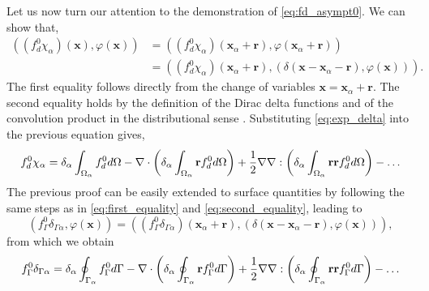 Let us now turn our attention to the demonstration of \ref{eq:fd_asympt0}. 
We can show that, 
\begin{align}
    ((f_d^0\chi_\alpha)(\textbf{x}),\varphi(\textbf{x}))
    &= ((f_d^0\chi_\alpha)(\textbf{x}_\alpha+\textbf{r}),\varphi(\textbf{x}_\alpha+\textbf{r})) \label{eq:first_equality}\\
    &= 
    ((f_d^0\chi_\alpha)(\textbf{x}_\alpha + \textbf{r}) ,(\delta(\textbf{x} - \textbf{x}_\alpha - \textbf{r}), \varphi(\textbf{x}))).
    \label{eq:second_equality}
\end{align}
The first equality follows directly from the change of variables $\textbf{x}=\textbf{x}_\alpha + \textbf{r}$. 
The second equality holds by the definition of the Dirac delta functions and of the convolution product in the distributional sense \citep{appel2007}.
Substituting \ref{eq:exp_delta}  into the previous equation gives, 
\begin{equation}
    f^0_d \chi_\alpha
    = 
    \delta_\alpha
    \int_{\Omega_{\alpha}} 
        f^0_d
     d\Omega
    - \mathbf{\nabla}\cdot\left(    
    \delta_\alpha
    \int_{\Omega_{\alpha}} 
    \textbf{r}
    f^0_d d\Omega
    \right)
    + \frac{1}{2}\mathbf{\nabla}\mathbf{\nabla} :\left(\delta_\alpha\int_{\Omega_{\alpha}} \textbf{rr} f^0_d d\Omega\right)
    - \ldots
\end{equation}
The previous proof can be easily extended to surface quantities by following the same steps as in \ref{eq:first_equality} and \ref{eq:second_equality},  leading to
\begin{equation} 
    (f_\Gamma^0 \delta_{\Gamma\alpha},\varphi(\textbf{x})) = ((f_\Gamma^0 \delta_{\Gamma\alpha})(\textbf{x}_\alpha + \textbf{r}) ,(\delta(\textbf{x} - \textbf{x}_\alpha - \textbf{r}), \varphi(\textbf{x}))),
\end{equation}
from which we obtain
\begin{equation} 
f_\Gamma^0 \delta_{\Gamma\alpha} 
=\delta_\alpha\oint_{\Gamma_{\alpha}} f^0_\Gamma d\Gamma
- \mathbf{\nabla}\cdot\left(\delta_\alpha\oint_{\Gamma_{\alpha}} \textbf{r} f^0_\Gamma d\Gamma\right)
+ \frac{1}{2}\mathbf{\nabla}\mathbf{\nabla} :\left(\delta_\alpha\oint_{\Gamma_{\alpha}} \textbf{rr} f^0_\Gamma d\Gamma\right)
-\ldots 
\end{equation}


